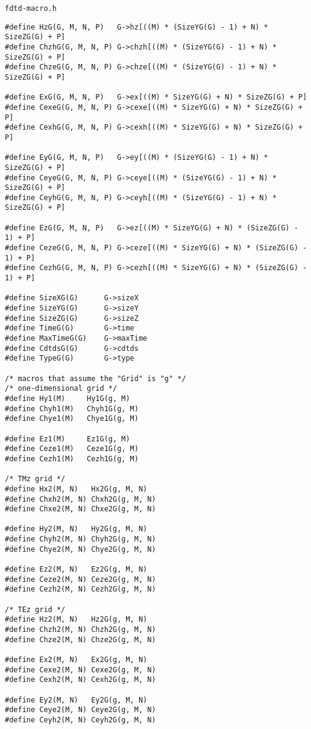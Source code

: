 \begin{program} {\tt fdtd-macro.h}
\begin{lstlisting}
#define HzG(G, M, N, P)   G->hz[((M) * (SizeYG(G) - 1) + N) * SizeZG(G) + P]
#define ChzhG(G, M, N, P) G->chzh[((M) * (SizeYG(G) - 1) + N) * SizeZG(G) + P]
#define ChzeG(G, M, N, P) G->chze[((M) * (SizeYG(G) - 1) + N) * SizeZG(G) + P]

#define ExG(G, M, N, P)   G->ex[((M) * SizeYG(G) + N) * SizeZG(G) + P]
#define CexeG(G, M, N, P) G->cexe[((M) * SizeYG(G) + N) * SizeZG(G) + P]
#define CexhG(G, M, N, P) G->cexh[((M) * SizeYG(G) + N) * SizeZG(G) + P]

#define EyG(G, M, N, P)   G->ey[((M) * (SizeYG(G) - 1) + N) * SizeZG(G) + P]
#define CeyeG(G, M, N, P) G->ceye[((M) * (SizeYG(G) - 1) + N) * SizeZG(G) + P]
#define CeyhG(G, M, N, P) G->ceyh[((M) * (SizeYG(G) - 1) + N) * SizeZG(G) + P]

#define EzG(G, M, N, P)   G->ez[((M) * SizeYG(G) + N) * (SizeZG(G) - 1) + P]
#define CezeG(G, M, N, P) G->ceze[((M) * SizeYG(G) + N) * (SizeZG(G) - 1) + P]
#define CezhG(G, M, N, P) G->cezh[((M) * SizeYG(G) + N) * (SizeZG(G) - 1) + P]

#define SizeXG(G)      G->sizeX
#define SizeYG(G)      G->sizeY
#define SizeZG(G)      G->sizeZ
#define TimeG(G)       G->time
#define MaxTimeG(G)    G->maxTime
#define CdtdsG(G)      G->cdtds
#define TypeG(G)       G->type

/* macros that assume the "Grid" is "g" */
/* one-dimensional grid */
#define Hy1(M)     Hy1G(g, M)
#define Chyh1(M)   Chyh1G(g, M)   
#define Chye1(M)   Chye1G(g, M)   

#define Ez1(M)     Ez1G(g, M)     
#define Ceze1(M)   Ceze1G(g, M)   
#define Cezh1(M)   Cezh1G(g, M)   

/* TMz grid */
#define Hx2(M, N)   Hx2G(g, M, N)   
#define Chxh2(M, N) Chxh2G(g, M, N) 
#define Chxe2(M, N) Chxe2G(g, M, N) 

#define Hy2(M, N)   Hy2G(g, M, N)   
#define Chyh2(M, N) Chyh2G(g, M, N) 
#define Chye2(M, N) Chye2G(g, M, N) 

#define Ez2(M, N)   Ez2G(g, M, N)   
#define Ceze2(M, N) Ceze2G(g, M, N) 
#define Cezh2(M, N) Cezh2G(g, M, N) 

/* TEz grid */
#define Hz2(M, N)   Hz2G(g, M, N)   
#define Chzh2(M, N) Chzh2G(g, M, N) 
#define Chze2(M, N) Chze2G(g, M, N) 

#define Ex2(M, N)   Ex2G(g, M, N)   
#define Cexe2(M, N) Cexe2G(g, M, N) 
#define Cexh2(M, N) Cexh2G(g, M, N) 

#define Ey2(M, N)   Ey2G(g, M, N)   
#define Ceye2(M, N) Ceye2G(g, M, N) 
#define Ceyh2(M, N) Ceyh2G(g, M, N) 


\end{lstlisting}
\end{program}
